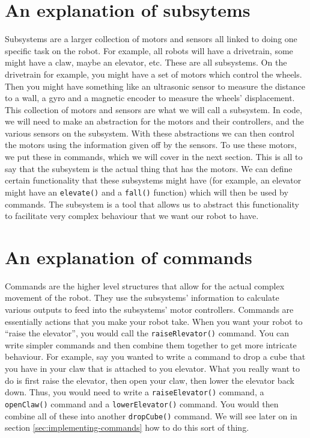 \documentclass[12pt]{article}
\begin{document}
\section{An explanation of subsytems}
Subsystems are a larger collection of motors and sensors all linked to doing one specific task on the robot. For example, all robots will have a drivetrain, some might have a claw, maybe an elevator, etc. These are all subsystems. On the drivetrain for example, you might have a set of motors which control the wheels. Then you might have something like an ultrasonic sensor to measure the distance to a wall, a gyro and a magnetic encoder to measure the wheels' displacement. This collection of motors and sensors are what we will call a subsystem. In code, we will need to make an abstraction for the motors and their controllers, and the various sensors on the subsystem. With these abstractions we can then control the motors using the information given off by the sensors. To use these motors, we put these in commands, which we will cover in the next section. This is all to say that the subsystem is the actual thing that has the motors. We can define certain functionality that these subsystems might have (for example, an elevator might have an \texttt{elevate()} and a \texttt{fall()} function) which will then be used by commands. The subsystem is a tool that allows us to abstract this functionality to facilitate very complex behaviour that we want our robot to have.

\section{An explanation of commands}
Commands are the higher level structures that allow for the actual complex movement of the robot. They use the subsystems' information to calculate various outputs to feed into the subsystems' motor controllers. Commands are essentially actions that you make your robot take. When you want your robot to ``raise the elevator'', you would call the \texttt{raiseRlevator()} command. You can write simpler commands and then combine them together to get more intricate behaviour. For example, say you wanted to write a command to drop a cube that you have in your claw that is attached to you elevator. What you really want to do is first raise the elevator, then open your claw, then lower the elevator back down. Thus, you would need to write a \texttt{raiseElevator()} command, a \texttt{openClaw()} command and a \texttt{lowerElevator()} command. You would then combine all of these into another \texttt{dropCube()} command. We will see later on in section \ref{sec:implementing-commands} how to do this sort of thing.
\end{document}
